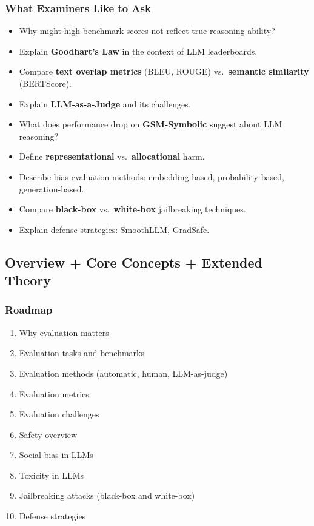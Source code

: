 \subsubsection*{What Examiners Like to Ask}

\begin{itemize}
  \item Why might high benchmark scores not reflect true reasoning ability?
  \item Explain \textbf{Goodhart's Law} in the context of LLM leaderboards.
  \item Compare \textbf{text overlap metrics} (BLEU, ROUGE) vs.\ \textbf{semantic similarity} (BERTScore).
  \item Explain \textbf{LLM-as-a-Judge} and its challenges.
  \item What does performance drop on \textbf{GSM-Symbolic} suggest about LLM reasoning?
  \item Define \textbf{representational} vs.\ \textbf{allocational} harm.
  \item Describe bias evaluation methods: embedding-based, probability-based, generation-based.
  \item Compare \textbf{black-box} vs.\ \textbf{white-box} jailbreaking techniques.
  \item Explain defense strategies: SmoothLLM, GradSafe.
\end{itemize}

\bigseparator

\subsection{Overview + Core Concepts + Extended Theory}

\subsubsection*{Roadmap}
\begin{enumerate}
  \item Why evaluation matters
  \item Evaluation tasks and benchmarks
  \item Evaluation methods (automatic, human, LLM-as-judge)
  \item Evaluation metrics
  \item Evaluation challenges
  \item Safety overview
  \item Social bias in LLMs
  \item Toxicity in LLMs
  \item Jailbreaking attacks (black-box and white-box)
  \item Defense strategies
\end{enumerate}


